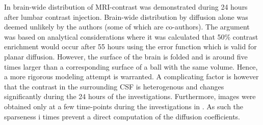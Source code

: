 \documentclass[11pt,a4paper]{article}
\newcommand{\kam}[1]{\textcolor{blue}{#1}}
\begin{document}

In \cite{ringstad2018brain} brain-wide distribution of MRI-contrast was demonstrated during 24 hours after lumbar contrast injection. Brain-wide distribution by diffusion alone was deemed unlikely by the authors (some of which are co-authors). The argument was based on analytical considerations where it was calculated that 50\% contrast enrichment would occur after 
55 hours using the error function which is valid for planar diffusion. However, 
the surface of the brain is folded and is around five times larger than 
a corresponding surface of a ball with the same volume. Hence, 
a more rigorous modeling attempt is warranted. A complicating factor
is however that the contrast in the surrounding CSF is heterogenous
and changes significantly during the 24 hours of the investigations. 
Furthermore, images were obtained only at a few time-points during the investigations in \cite{ringstad2018brain}. As such the sparseness i times prevent a direct computation of the diffusion coefficients.
\end{document}
